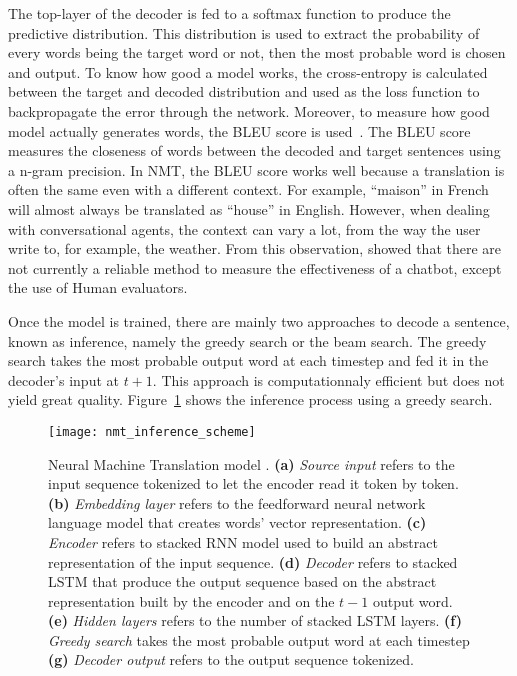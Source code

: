 The top-layer of the decoder is fed to a softmax function to produce the predictive distribution. This distribution is used to extract the probability of every words being the target word or not, then the most probable word is chosen and output. To know how good a model works, the cross-entropy is calculated between the target and decoded distribution and used as the loss function to backpropagate the error through the network.
Moreover, to measure how good model actually generates words, the BLEU score is used~\citep{bleu-score}. The BLEU score measures the closeness of words between the decoded and target sentences using a n-gram precision.
In NMT, the BLEU score works well because a translation is often the same even with a different context. For example, ``maison'' in French will almost always be translated as ``house'' in English.
However, when dealing with conversational agents, the context can vary a lot, from the way the user write to, for example, the weather. From this observation, \citet{1603.08023} showed that there are not currently a reliable method to measure the effectiveness of a chatbot, except the use of Human evaluators.

Once the model is trained, there are mainly two approaches to decode a sentence, known as inference, namely the greedy search or the beam search. The greedy search takes the most probable output word at each timestep and fed it in the decoder's input at $t+1$. This approach is computationnaly efficient but does not yield great quality. Figure~\ref{fig:nmt-inference} shows the inference process using a greedy search.
\begin{figure}
    \centering
    \texttt{[image: nmt\_inference\_scheme]}
    \decoRule
    \caption[Neural Machine Translation model scheme]{Neural Machine Translation model \citep{tensorflow.nmt}. \textbf{(a)} \textit{Source input} refers to the input sequence tokenized to let the encoder read it token by token. \textbf{(b)} \textit{Embedding layer} refers to the feedforward neural network language model that creates words' vector representation. \textbf{(c)} \textit{Encoder} refers to stacked RNN model used to build an abstract representation of the input sequence. \textbf{(d)} \textit{Decoder} refers to stacked LSTM that produce the output sequence based on the abstract representation built by the encoder and on the $t-1$ output word. \textbf{(e)} \textit{Hidden layers} refers to the number of stacked LSTM layers. \textbf{(f)} \textit{Greedy search} takes the most probable output word at each timestep  \textbf{(g)} \textit{Decoder output} refers to the output sequence tokenized.}
    \label{fig:nmt-inference}
\end{figure}


